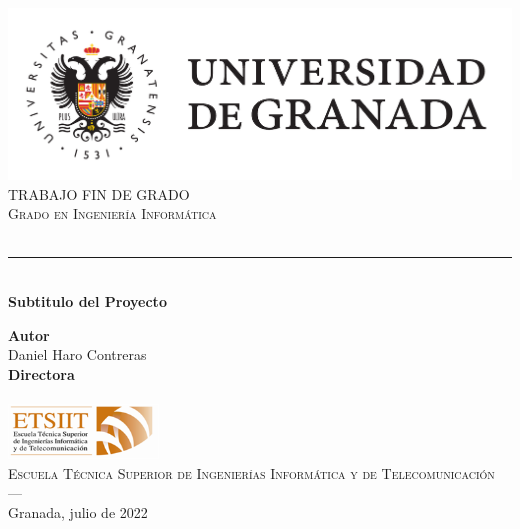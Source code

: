\begin{titlepage}
 
 
\newlength{\centeroffset}
\setlength{\centeroffset}{-0.5\oddsidemargin}
\addtolength{\centeroffset}{0.5\evensidemargin}
\thispagestyle{empty}

\noindent\hspace*{\centeroffset}\begin{minipage}{\textwidth}

\centering
\includegraphics[width=\textwidth]{imagenes/logo_ugr.pdf}\\[1.4cm]

\textsc{ \Large TRABAJO FIN DE GRADO\\[0.2cm]}
\textsc{ Grado en Ingeniería Informática }\\[1cm]
% 
{\Huge\bfseries \myTitle \\
}
\noindent\rule[-1ex]{\textwidth}{3pt}\\[3.5ex]
{\large\bfseries Subtitulo del Proyecto}
\end{minipage}

\vspace{2.5cm}
\noindent\hspace*{\centeroffset}\begin{minipage}{\textwidth}
\centering

\textbf{Autor}\\ {Daniel Haro Contreras}\\[2.5ex]
\textbf{Directora}\\
{\myProf}\\[1cm]
\includegraphics[width=0.3\textwidth]{imagenes/etsiit_logo.png}\\[0.1cm]
\textsc{Escuela Técnica Superior de Ingenierías Informática y de Telecomunicación}\\
\textsc{---}\\
Granada, julio de 2022
\end{minipage}
\end{titlepage}


